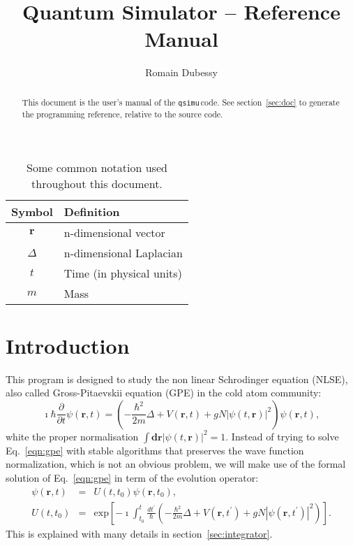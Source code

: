 \documentclass[12pt,a4paper]{report}
\author{Romain Dubessy}
\title{Quantum Simulator -- Reference Manual}
\newcommand{\abs}[1]{\left|#1\right|}
\newcommand{\qsimu}{\texttt{qsimu}\,}
\renewcommand{\exp}[1]{\textrm{exp}\left[#1\right]}
\begin{document}
\maketitle
\begin{abstract}
This document is the user's manual of the \qsimu code.
See section~\ref{sec:doc} to generate the programming reference, relative to the source code.
\end{abstract}
\begin{table}
\begin{center}
\begin{tabular}{c|l}
Symbol & Definition \\\hline
$\bm{r}$ & n-dimensional vector\\
$\Delta$ & n-dimensional Laplacian\\
$t$ & Time (in physical units)\\
$m$ & Mass\\
\hline
\end{tabular}
\caption{\label{tab:notations}Some common notation used throughout this document.}
\end{center}
\end{table}
\cleardoublepage
\tableofcontents
\chapter{Introduction}
This program is designed to study the non linear Schrodinger equation (NLSE), also called Gross-Pitaevskii equation (GPE) in the cold atom community:
\begin{equation}
\imath\hbar\frac{\partial}{\partial t}\psi(\bm{r},t)=\left(-\frac{\hbar^2}{2m}\Delta+V(\bm{r},t)+gN\abs{\psi(t,\bm{r})}^2\right)\psi(\bm{r},t),
\label{eqn:gpe}
\end{equation}
white the proper normalisation $\int \bm{dr}\abs{\psi(t,\bm{r})}^2=1$.
Instead of trying to solve Eq.~\eqref{eqn:gpe} with stable algorithms that preserves the wave function normalization, which is not an obvious problem, we will make use of the formal solution of Eq.~\eqref{eqn:gpe} in term of the evolution operator:
\begin{subequations}
\begin{eqnarray}
\psi(\bm{r},t)&=&U(t,t_0)\psi(\bm{r},t_0),\\
U(t,t_0)&=&\exp{-\imath\int_{t_0}^t\frac{dt^\prime}{\hbar}\left(-\frac{\hbar^2}{2m}\Delta+V(\bm{r},t^\prime)+gN\abs{\psi(\bm{r},t^\prime)}^2\right)}.
\label{eqn:evolution}
\end{eqnarray}
\end{subequations}
This is explained with many details in section~\ref{sec:integrator}.
\end{document}
